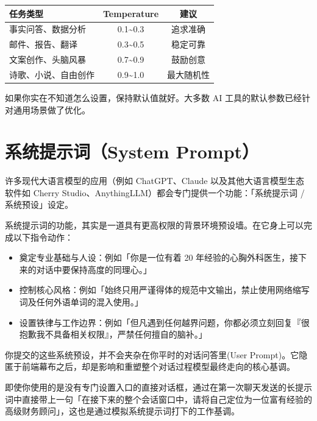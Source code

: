 \begin{center}
\begin{tabular}{lcc}
  \toprule
  \textbf{任务类型} & \textbf{Temperature} & \textbf{建议} \\
  \midrule
  事实问答、数据分析 & 0.1\textasciitilde 0.3 & 追求准确 \\
  邮件、报告、翻译    & 0.3\textasciitilde 0.5 & 稳定可靠 \\
  文案创作、头脑风暴  & 0.7\textasciitilde 0.9 & 鼓励创意 \\
  诗歌、小说、自由创作 & 0.9\textasciitilde 1.0 & 最大随机性 \\
  \bottomrule
\end{tabular}
\end{center}

如果你实在不知道怎么设置，保持默认值就好。大多数 AI 工具的默认参数已经针对通用场景做了优化。

\section{系统提示词（System Prompt）}
\label{sec:system-prompt}

许多现代大语言模型的应用（例如 ChatGPT、Claude 以及其他大语言模型生态软件如 Cherry Studio、AnythingLLM）都会专门提供一个功能：「系统提示词 / 系统预设」设定。

系统提示词的功能，其实是一道具有更高权限的背景环境预设墙。在它身上可以完成以下指令动作：

\begin{itemize}
  \item 奠定专业基础与人设：例如「你是一位有着 20 年经验的心胸外科医生，接下来的对话中要保持高度的同理心。」
  \item 控制核心风格：例如「始终只用严谨得体的规范中文输出，禁止使用网络缩写词及任何外语单词的混入使用。」
  \item 设置铁律与工作边界：例如「但凡遇到任何越界问题，你都必须立刻回复『很抱歉我不具备相关权限』，严禁任何擅自的脑补。」
\end{itemize}

你提交的这些系统预设，并不会夹杂在你平时的对话问答里(User Prompt)。它隐匿于前端幕布之后，却是影响和重塑整个对话过程模型最终走向的核心基调。

\begin{tipbox}
即使你使用的是没有专门设置入口的直接对话框，通过在第一次聊天发送的长提示词中直接带上一句「在接下来的整个会话窗口中，请将自己定位为一位富有经验的高级财务顾问」，这也是通过模拟系统提示词打下的工作基调。
\end{tipbox}

